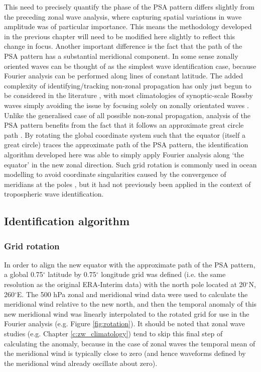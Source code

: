 This need to precisely quantify the phase of the PSA pattern differs slightly from the preceding zonal wave analysis, where capturing spatial variations in wave amplitude was of particular importance. This means the methodology developed in the previous chapter will need to be modified here slightly to reflect this change in focus. Another important difference is the fact that the path of the PSA pattern has a substantial meridional component. In some sense zonally oriented waves can be thought of as the simplest wave identification case, because Fourier analysis can be performed along lines of constant latitude. The added complexity of identifying/tracking non-zonal propagation has only just begun to be considered in the literature \citep[e.g.][]{Zimin2006,Souders2014}, with most climatologies of synoptic-scale Rossby waves simply avoiding the issue by focusing solely on zonally orientated waves \citep[e.g.][]{Glatt2014}. Unlike the generalised case of all possible non-zonal propagation, analysis of the PSA pattern benefits from the fact that it follows an approximate great circle path \citep{Hoskins1981}. By rotating the global coordinate system such that the equator (itself a great circle) traces the approximate path of the PSA pattern, the identification algorithm developed here was able to simply apply Fourier analysis along `the equator' in the new zonal direction. Such grid rotation is commonly used in ocean modelling to avoid coordinate singularities caused by the convergence of meridians at the poles \citep[i.e. the grid is rotated to place its North Pole over a continent; e.g.][]{Bonaventura2012}, but it had not previously been applied in the context of tropospheric wave identification.

\subsection{Identification algorithm}\label{s:psa_id}

\subsubsection{Grid rotation}

In order to align the new equator with the approximate path of the PSA pattern, a global 0.75$^{\circ}$ latitude by 0.75$^{\circ}$ longitude grid was defined (i.e. the same resolution as the original ERA-Interim data) with the north pole located at 20$^{\circ}$N, 260$^{\circ}$E. The 500 hPa zonal and meridional wind data were used to calculate the meridional wind relative to the new north, and then the temporal anomaly of this new meridional wind was linearly interpolated to the rotated grid for use in the Fourier analysis (e.g. Figure \ref{fig:rotation}). It should be noted that zonal wave studies (e.g. Chapter \ref{c:zw_climatology}) tend to skip this final step of calculating the anomaly, because in the case of zonal waves the temporal mean of the meridional wind is typically close to zero (and hence waveforms defined by the meridional wind already oscillate about zero). 

